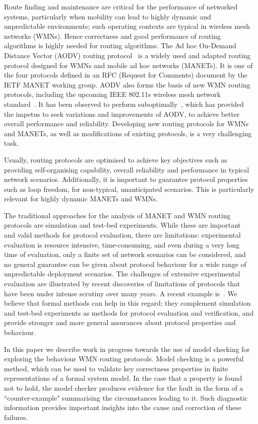 \documentclass[conference,twoside]{IEEEtran}
\begin{document}
Route finding and maintenance are critical for the performance of
networked systems, particularly when mobility can lead to highly
dynamic and unpredictable environments; such operating contexts are
typical in wireless mesh networks (WMNs).
Hence correctness and good performance of routing algorithms is highly needed for
routing algorithms. The Ad hoc On-Demand Distance Vector
(AODV) routing protocol~\cite{rfc3561} is a widely used and
adapted routing protocol designed for WMNs and mobile ad hoc networks (MANETs).
It is one of the four protocols
defined in an RFC (Request for Comments) document by the IETF MANET working group.
AODV also forms the basis of new WMN routing protocols, including the upcoming IEEE 802.11s
wireless mesh network standard~\cite{IEEE80211s}.
It has been observed to perform suboptimally~\cite{MK10}, which has provided the impetus to seek variations
and improvements of AODV,
to achieve better overall performance and reliability.
Developing new routing protocols for WMNs and
MANETs, as well as modifications
of existing protocols, is a very challenging task.

Usually, routing protocols are optimised to achieve key
objectives such as providing self-organising capability, overall
reliability and performance in typical network scenarios. Additionally, it is important
to guarantee protocol properties such as loop freedom, for non-typical, unanticipated scenarios. This is particularly relevant for highly dynamic MANETs and WMNs.


The traditional approaches for the analysis of MANET and WMN routing
protocols are simulation and test-bed experiments. While these are
important and valid methods for protocol evaluation, there are
limitations: experimental evaluation is resource intensive,
time-consuming, and even during a very long time of evaluation, only a
finite set of network scenarios can be considered, and no general
guarantee can be given about protocol behaviour for a wide range of
unpredictable deployment scenarios.  The challenges of extensive
experimental evaluation are illustrated by recent discoveries of
limitations of protocols that have been under intense scrutiny over
many years.
A recent example is~\cite{MK10}.
 We believe that formal methods can help in this
regard; they complement simulation and test-bed experiments as methods
for protocol evaluation and verification, and provide stronger and
more general assurances about protocol properties and behaviour.

In this paper we describe work in progress towards the use of model checking
for exploring the behaviour  WMN routing protocols. Model checking is a powerful method, which can be used to validate key correctness properties in finite representations of a formal system model. In the case that a property is found not to hold, the model checker produces evidence for the fault in the form of a  ``counter-example" summarising the circumstances leading to it. Such diagnostic information provides important insights into the cause and correction of these failures.
\end{document}
